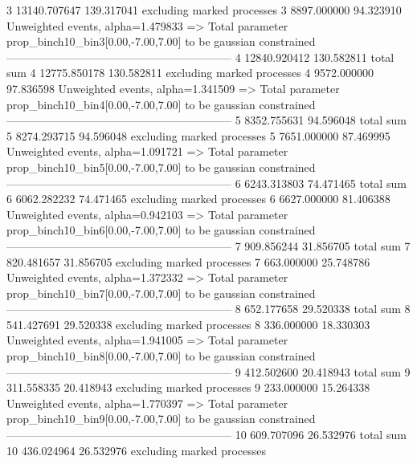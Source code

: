 3          13140.707647    139.317041      excluding marked processes    
3          8897.000000     94.323910       Unweighted events, alpha=1.479833
  => Total parameter prop_binch10_bin3[0.00,-7.00,7.00] to be gaussian constrained
------------------------------------------------------------
4          12840.920412    130.582811      total sum                     
4          12775.850178    130.582811      excluding marked processes    
4          9572.000000     97.836598       Unweighted events, alpha=1.341509
  => Total parameter prop_binch10_bin4[0.00,-7.00,7.00] to be gaussian constrained
------------------------------------------------------------
5          8352.755631     94.596048       total sum                     
5          8274.293715     94.596048       excluding marked processes    
5          7651.000000     87.469995       Unweighted events, alpha=1.091721
  => Total parameter prop_binch10_bin5[0.00,-7.00,7.00] to be gaussian constrained
------------------------------------------------------------
6          6243.313803     74.471465       total sum                     
6          6062.282232     74.471465       excluding marked processes    
6          6627.000000     81.406388       Unweighted events, alpha=0.942103
  => Total parameter prop_binch10_bin6[0.00,-7.00,7.00] to be gaussian constrained
------------------------------------------------------------
7          909.856244      31.856705       total sum                     
7          820.481657      31.856705       excluding marked processes    
7          663.000000      25.748786       Unweighted events, alpha=1.372332
  => Total parameter prop_binch10_bin7[0.00,-7.00,7.00] to be gaussian constrained
------------------------------------------------------------
8          652.177658      29.520338       total sum                     
8          541.427691      29.520338       excluding marked processes    
8          336.000000      18.330303       Unweighted events, alpha=1.941005
  => Total parameter prop_binch10_bin8[0.00,-7.00,7.00] to be gaussian constrained
------------------------------------------------------------
9          412.502600      20.418943       total sum                     
9          311.558335      20.418943       excluding marked processes    
9          233.000000      15.264338       Unweighted events, alpha=1.770397
  => Total parameter prop_binch10_bin9[0.00,-7.00,7.00] to be gaussian constrained
------------------------------------------------------------
10         609.707096      26.532976       total sum                     
10         436.024964      26.532976       excluding marked processes    
